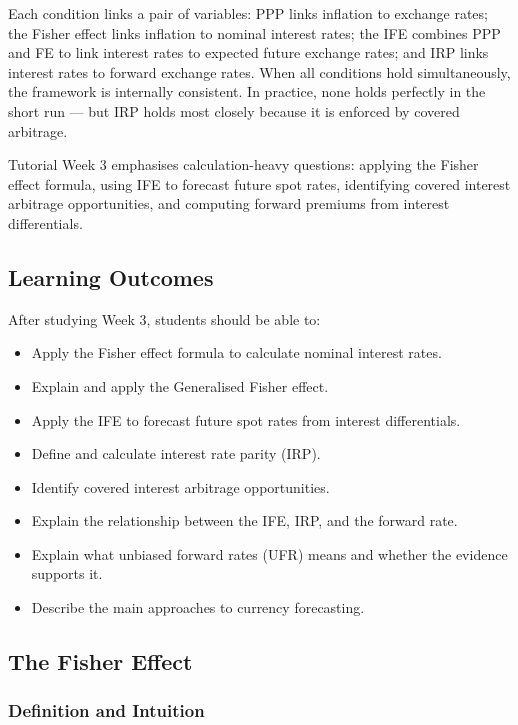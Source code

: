 \documentclass[11pt,a4paper]{article}
\begin{document}
Each condition links a pair of variables: PPP links inflation to exchange rates; the Fisher effect links inflation to nominal interest rates; the IFE combines PPP and FE to link interest rates to expected future exchange rates; and IRP links interest rates to forward exchange rates. When all conditions hold simultaneously, the framework is internally consistent. In practice, none holds perfectly in the short run --- but IRP holds most closely because it is enforced by covered arbitrage.

Tutorial Week 3 emphasises calculation-heavy questions: applying the Fisher effect formula, using IFE to forecast future spot rates, identifying covered interest arbitrage opportunities, and computing forward premiums from interest differentials.

\subsection{Learning Outcomes}

After studying Week 3, students should be able to:
\begin{itemize}
  \item Apply the Fisher effect formula to calculate nominal interest rates.
  \item Explain and apply the Generalised Fisher effect.
  \item Apply the IFE to forecast future spot rates from interest differentials.
  \item Define and calculate interest rate parity (IRP).
  \item Identify covered interest arbitrage opportunities.
  \item Explain the relationship between the IFE, IRP, and the forward rate.
  \item Explain what unbiased forward rates (UFR) means and whether the evidence supports it.
  \item Describe the main approaches to currency forecasting.
\end{itemize}

\subsection{The Fisher Effect}

\subsubsection{Definition and Intuition}
\end{document}
